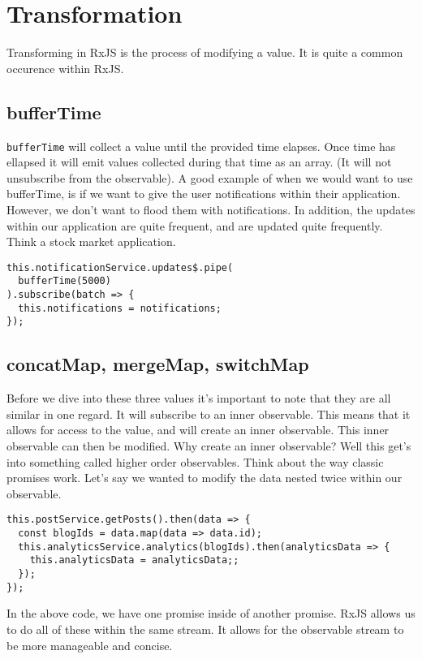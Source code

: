 \chapter{Transformation}
Transforming in RxJS is the process of modifying a value. It is quite 
a common occurence within RxJS.

\section{bufferTime}
\lstinline{bufferTime} will collect a value until the provided time elapses. 
Once time has ellapsed it will emit values collected during that time as an 
array. (It will not unsubscribe from the observable). A good example of when we
would want to use bufferTime, is if we want to give the user notifications 
within their application. However, we don't want to flood them with 
notifications. In addition, the updates within our application are quite 
frequent, and are updated quite frequently. Think a stock market application.

\begin{lstlisting}
this.notificationService.updates$.pipe(
  bufferTime(5000)
).subscribe(batch => {
  this.notifications = notifications;
});  
\end{lstlisting}

\section{concatMap, mergeMap, switchMap}
Before we dive into these three values it's important to note that they are 
all similar in one regard. It will subscribe to an inner observable. This 
means that it allows for access to the value, and will create an inner 
observable. This inner observable can then be modified. Why create an inner
observable? Well this get's into something called higher order observables. 
Think about the way classic promises work. Let's say we wanted to modify the 
data nested twice within our observable.
\begin{lstlisting}
this.postService.getPosts().then(data => {
  const blogIds = data.map(data => data.id);
  this.analyticsService.analytics(blogIds).then(analyticsData => {
    this.analyticsData = analyticsData;; 
  });
});  
\end{lstlisting}

In the above code, we have one promise inside of another promise. RxJS allows us
to do all of these within the same stream. It allows for the observable stream to 
be more manageable and concise. 

